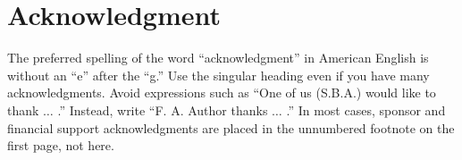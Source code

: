 \documentclass{ieeeaccess}
\begin{document}
\section*{Acknowledgment}
The preferred spelling of the word ``acknowledgment'' in American English is
without an ``e'' after the ``g.'' Use the singular heading even if you have
many acknowledgments. Avoid expressions such as ``One of us (S.B.A.) would
like to thank $\ldots$ .'' Instead, write ``F. A. Author thanks $\ldots$ .'' In most
cases, sponsor and financial support acknowledgments are placed in the
unnumbered footnote on the first page, not here.

\end{document}
